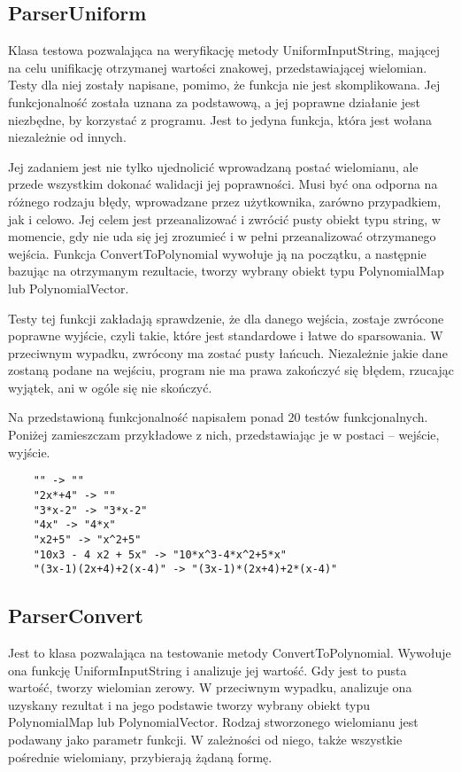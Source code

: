 \documentclass[oneside,a4paper]{book}
\begin{document}
	\subsection{ParserUniform}
	
	Klasa testowa pozwalająca na weryfikację metody UniformInputString, mającej na celu unifikację otrzymanej wartości znakowej, przedstawiającej wielomian. Testy dla niej zostały napisane, pomimo, że funkcja nie jest skomplikowana. Jej funkcjonalność została uznana za podstawową, a jej poprawne działanie jest niezbędne, by korzystać z programu. Jest to jedyna funkcja, która jest wołana niezależnie od innych.
	
	Jej zadaniem jest nie tylko ujednolicić wprowadzaną postać wielomianu, ale przede wszystkim dokonać walidacji jej poprawności. Musi być ona odporna na różnego rodzaju błędy, wprowadzane przez użytkownika, zarówno przypadkiem, jak i celowo. Jej celem jest przeanalizować i zwrócić pusty obiekt typu string, w momencie, gdy nie uda się jej zrozumieć i w pełni przeanalizować otrzymanego wejścia. Funkcja ConvertToPolynomial wywołuje ją na początku, a następnie bazując na otrzymanym rezultacie, tworzy wybrany obiekt typu PolynomialMap lub PolynomialVector.
	
	Testy tej funkcji zakładają sprawdzenie, że dla danego wejścia, zostaje zwrócone poprawne wyjście, czyli takie, które jest standardowe i łatwe do sparsowania. W przeciwnym wypadku, zwrócony ma zostać pusty łańcuch. Niezależnie jakie dane zostaną podane na wejściu, program nie ma prawa zakończyć się błędem, rzucając wyjątek, ani w ogóle się nie skończyć.
	
	Na przedstawioną funkcjonalność napisałem ponad $20$ testów funkcjonalnych. Poniżej zamieszczam przykładowe z nich, przedstawiając je w postaci -- wejście, wyjście. 
	
	\begin{lstlisting}
	"" -> ""
	"2x*+4" -> ""
	"3*x-2" -> "3*x-2"
	"4x" -> "4*x"
	"x2+5" -> "x^2+5"
	"10x3 - 4 x2 + 5x" -> "10*x^3-4*x^2+5*x"
	"(3x-1)(2x+4)+2(x-4)" -> "(3x-1)*(2x+4)+2*(x-4)"
	\end{lstlisting}
	
	\subsection{ParserConvert}
	
	Jest to klasa pozwalająca na testowanie metody ConvertToPolynomial. Wywołuje ona funkcję UniformInputString i analizuje jej wartość. Gdy jest to pusta wartość, tworzy wielomian zerowy. W przeciwnym wypadku, analizuje ona uzyskany rezultat i na jego podstawie tworzy wybrany obiekt typu PolynomialMap lub PolynomialVector. Rodzaj stworzonego wielomianu jest podawany jako parametr funkcji. W zależności od niego, także wszystkie pośrednie wielomiany, przybierają żądaną formę.
	
\end{document}
